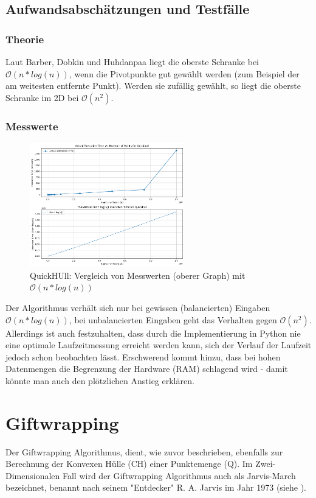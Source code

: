 \documentclass[Labor, MSC, german]{twbook}
\begin{document}
\subsection{Aufwandsabschätzungen und Testfälle}
\subsubsection{Theorie}
Laut Barber, Dobkin und Huhdanpaa \cite{10.1145/235815.235821} liegt die oberste Schranke bei $\mathcal{O}(n * log( n))$, wenn die Pivotpunkte gut gewählt werden (zum Beispiel der am weitesten entfernte Punkt). Werden sie zufällig gewählt, so liegt die oberste Schranke im 2D bei $\mathcal{O}(n^2)$.

\subsubsection{Messwerte}
\begin{figure}[H]
    \centering
    \includegraphics[width=0.6\textwidth]{./PICs/QuickHull.png}
    \caption{QuickHUll: Vergleich von Messwerten (oberer Graph) mit $\mathcal{O}(n* log(n))$}
    \label{fig:quickHull}
\end{figure}
Der Algorithmus verhält sich nur bei gewissen (balancierten) Eingaben $\mathcal{O}(n* log(n))$, bei unbalancierten Eingaben geht das Verhalten gegen $\mathcal{O}(n^2)$. Allerdings ist auch festzuhalten, dass durch die Implementierung in Python nie eine optimale Laufzeitmessung erreicht werden kann, sich der Verlauf der Laufzeit jedoch schon beobachten lässt. Erschwerend kommt hinzu, dass bei hohen Datenmengen die Begrenzung der Hardware (RAM) schlagend wird - damit könnte man auch den plötzlichen Anstieg erklären.



\section{Giftwrapping}
Der Giftwrapping Algorithmus, dient, wie zuvor beschrieben, ebenfalls zur Berechnung der Konvexen Hülle (CH) einer Punktemenge (Q). Im Zwei-Dimensionalen Fall wird der Giftwrapping Algorithmus auch als Jarvis-March bezeichnet, benannt nach seinem "Entdecker"  R. A. Jarvis im Jahr 1973 (siehe \cite{JARVIS197318}).
\end{document}
